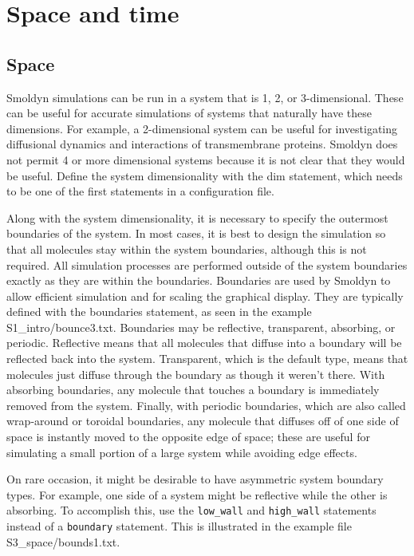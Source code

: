 \documentclass {scrbook}
\newcommand {\ttt} {\texttt}
\begin{document}
\chapter{Space and time}

\section{Space}

Smoldyn simulations can be run in a system that is 1, 2, or 3-dimensional. These can be useful for accurate simulations of systems that naturally have these dimensions. For example, a 2-dimensional system can be useful for investigating diffusional dynamics and interactions of transmembrane proteins. Smoldyn does not permit 4 or more dimensional systems because it is not clear that they would be useful. Define the system dimensionality with the dim statement, which needs to be one of the first statements in a configuration file.

Along with the system dimensionality, it is necessary to specify the outermost boundaries of the system. In most cases, it is best to design the simulation so that all molecules stay within the system boundaries, although this is not required. All simulation processes are performed outside of the system boundaries exactly as they are within the boundaries. Boundaries are used by Smoldyn to allow efficient simulation and for scaling the graphical display. They are typically defined with the boundaries statement, as seen in the example S1\_intro/bounce3.txt. Boundaries may be reflective, transparent, absorbing, or periodic. Reflective means that all molecules that diffuse into a boundary will be reflected back into the system. Transparent, which is the default type, means that molecules just diffuse through the boundary as though it weren't there. With absorbing boundaries, any molecule that touches a boundary is immediately removed from the system. Finally, with periodic boundaries, which are also called wrap-around or toroidal boundaries, any molecule that diffuses off of one side of space is instantly moved to the opposite edge of space; these are useful for simulating a small portion of a large system while avoiding edge effects.

On rare occasion, it might be desirable to have asymmetric system boundary types. For example, one side of a system might be reflective while the other is absorbing. To accomplish this, use the \ttt{low\_wall} and \ttt{high\_wall} statements instead of a \ttt{boundary} statement. This is illustrated in the example file S3\_space/bounds1.txt.
\end{document}
